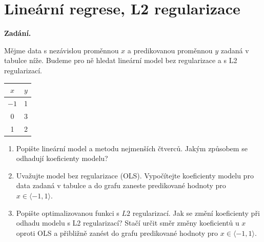 \section{Lineární regrese, L2 regularizace}

\noindent\textbf{Zadání.}\par
Mějme data s nezávislou proměnnou $x$ a predikovanou proměnnou $y$ zadaná v tabulce níže. Budeme
pro ně hledat lineární model bez regularizace a s L2 regularizací.

\begin{center}
\begin{tabular}{c|c}
\toprule
$x$ & $y$ \\
\midrule
$-1$ & 1 \\
0 & 3 \\
1 & 2 \\
\bottomrule
\end{tabular}
\end{center}

\begin{enumerate}
  \item Popište lineární model a metodu nejmenších čtverců. Jakým způsobem se odhadují koeficienty modelu?
  \item Uvažujte model bez regularizace (OLS). Vypočítejte koeficienty modelu pro data zadaná
    v tabulce a do grafu zaneste predikované hodnoty pro $x \in \langle -1, 1 \rangle$.
  \item Popište optimalizovanou funkci s $L2$ regularizací. Jak se změní koeficienty při odhadu
    modelu s L2 regularizací? Stačí určit směr změny koeficientů u $x$ oproti OLS a přibližně
    zanést do grafu predikované hodnoty pro $x \in \langle -1, 1 \rangle$.
\end{enumerate}

